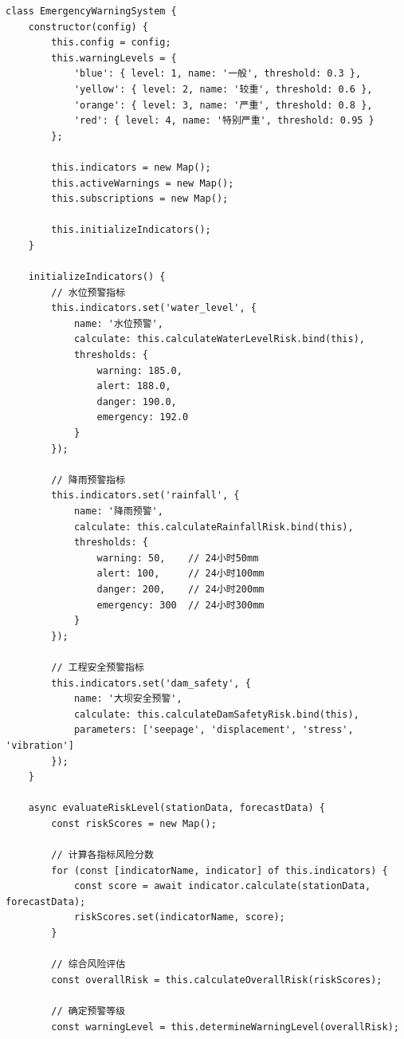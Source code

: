 \begin{lstlisting}
class EmergencyWarningSystem {
    constructor(config) {
        this.config = config;
        this.warningLevels = {
            'blue': { level: 1, name: '一般', threshold: 0.3 },
            'yellow': { level: 2, name: '较重', threshold: 0.6 },
            'orange': { level: 3, name: '严重', threshold: 0.8 },
            'red': { level: 4, name: '特别严重', threshold: 0.95 }
        };
        
        this.indicators = new Map();
        this.activeWarnings = new Map();
        this.subscriptions = new Map();
        
        this.initializeIndicators();
    }
    
    initializeIndicators() {
        // 水位预警指标
        this.indicators.set('water_level', {
            name: '水位预警',
            calculate: this.calculateWaterLevelRisk.bind(this),
            thresholds: {
                warning: 185.0,
                alert: 188.0,
                danger: 190.0,
                emergency: 192.0
            }
        });
        
        // 降雨预警指标
        this.indicators.set('rainfall', {
            name: '降雨预警',
            calculate: this.calculateRainfallRisk.bind(this),
            thresholds: {
                warning: 50,    // 24小时50mm
                alert: 100,     // 24小时100mm
                danger: 200,    // 24小时200mm
                emergency: 300  // 24小时300mm
            }
        });
        
        // 工程安全预警指标
        this.indicators.set('dam_safety', {
            name: '大坝安全预警',
            calculate: this.calculateDamSafetyRisk.bind(this),
            parameters: ['seepage', 'displacement', 'stress', 'vibration']
        });
    }
    
    async evaluateRiskLevel(stationData, forecastData) {
        const riskScores = new Map();
        
        // 计算各指标风险分数
        for (const [indicatorName, indicator] of this.indicators) {
            const score = await indicator.calculate(stationData, forecastData);
            riskScores.set(indicatorName, score);
        }
        
        // 综合风险评估
        const overallRisk = this.calculateOverallRisk(riskScores);
        
        // 确定预警等级
        const warningLevel = this.determineWarningLevel(overallRisk);
        

\end{lstlisting}
